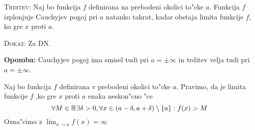 \textsc{Trditev:} Naj bo funkcija $f$ definirana na prebodeni okolici to"cke $a$. Funkcija $f$ izplonjuje Cauchyjev pogoj pri $a$ natanko takrat, kadar obstaja limita funkcije $f$, ko gre $x$ proti $a$.

\textsc{Dokaz:} Za DN.

\textbf{Opomba:} Cauchyjev pogoj ima smisel tudi pri $a = \pm \infty$ in trditev velja tudi pri $a = \pm \infty$.

 Naj bo funkcija $f$ definirana v prebodeni okolici to"cke $a$. Pravimo, da je limita funkcije $f$ ,ko gre $x$ proti $a$ enaka neskon"cno "ce
\begin{equation*}
\forall M \in \mathbb{R} \exists \delta > 0, \forall x \in (a - \delta, a + \delta) \setminus \{a\}: f(x) > M
\end{equation*}
Ozna"cimo z $\lim_{x \to a} f(x) = \infty$


